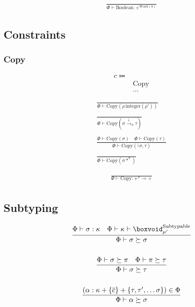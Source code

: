 \documentclass {article}
\begin{document}
\begin{gather*}
\frac
{}
{ \Phi \vdash \text{Boolean} : +^{\text{Word}(8)}}
\end{gather*}

\subsection{Constraints}

\subsubsection{Copy}
\begin{align*}
c \Coloneqq & \\
& \text{Copy} \\
& \dots
\end{align*}

\begin{gather*}
\frac
{}
{\Phi \vdash \text{Copy} (\rho \, \text{integer} (\rho'))} \\
\\
\frac
{}
{\Phi \vdash \text{Copy} (\sigma \xrightarrow{\downarrow}_\pi \tau)} \\
\\
\frac
{\Phi \vdash \text{Copy}(\sigma) \quad \Phi \vdash \text{Copy}(\tau) }
{\Phi \vdash \text{Copy} (^\downarrow \sigma, \tau ) } \\
\\
\frac
{}
{\Phi \vdash \text{Copy} (\sigma *^\pi) }
\end{gather*}

\begin{gather*}
\frac
{}
{\Phi \vdash \text{Copy} : +^{\rho} \to \diamond} \\
\end{gather*}

\subsection{Subtyping}
\begin{gather*}
\frac
{\Phi \vdash \sigma : \kappa \quad \Phi \vdash \kappa \vdash \boxvoid^\text{Subtypable}_{\mu'}}
{\Phi \vdash \sigma \succeq \sigma} \\
\\
\frac
{\Phi \vdash \sigma \succeq \pi \quad \Phi \vdash \pi \succeq \tau}
{\Phi \vdash \sigma \succeq \tau} \\
\\
\frac
{(\alpha : \kappa + \{ \overline c \} + \{ \tau, \tau', \dots \sigma \}) \in \Phi }
{\Phi \vdash \alpha \succeq \sigma}
\end{gather*}
\end{document}
